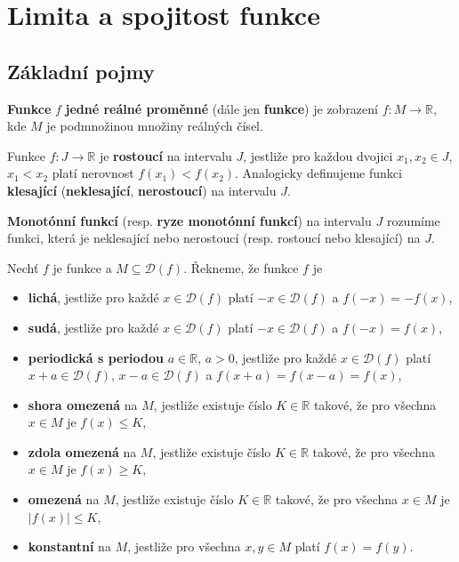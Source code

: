 \section{Limita a spojitost funkce}
\subsection{Základní pojmy}
\begin{definice}
\textbf{Funkce} $f$ \textbf{jedné reálné proměnné} (dále jen \textbf{funkce}) je zobrazení
$f: M\to \mathbb R $, kde $M$ je podmnožinou množiny reálných čísel.
\end{definice}

\begin{definice}
	Funkce $f: J\to \mathbb R $ je \textbf{rostoucí} na intervalu $J$, jestliže pro
	každou dvojici $x_1, x_2 \in J$, $x_1 < x_2$ platí nerovnost $f(x_1)<f(x_2)$. Analogicky
	definujeme funkci \textbf{klesající} (\textbf{neklesající}, \textbf{nerostoucí}) na intervalu $J$.
\end{definice}

\begin{definice}
\textbf{Monotónní funkcí} (resp. \textbf{ryze monotónní funkcí}) na intervalu $J$ rozumíme funkci,
která je neklesající nebo nerostoucí (resp. rostoucí nebo klesající) na $J$.
\end{definice}

\begin{definice}
Nechť $f$ je funkce a $M \subseteq \mathcal D(f)$. Řekneme, že funkce $f$ je
\begin{itemize}
  \item \textbf{lichá}, jestliže pro každé $x \in \mathcal D(f)$ platí $-x \in \mathcal D(f)$ a
  $f(-x) = -f(x)$,
  \item \textbf{sudá}, jestliže pro každé $x \in \mathcal D(f)$ platí $-x \in \mathcal D(f)$ a
  $f(-x) = f(x)$,
  \item \textbf{periodická s periodou} $a \in \mathbb{R}$, $a > 0$, jestliže pro každé
  $x \in \mathcal D(f)$ platí $x + a \in \mathcal D(f)$, $x - a \in \mathcal D(f)$ a
  $f(x + a) = f(x - a) = f(x)$,
  \item \textbf{shora omezená} na $M$, jestliže existuje číslo $K \in \mathbb{R}$ takové,
  že pro všechna $x \in M$ je $f(x) \le K$,
  \item \textbf{zdola omezená} na $M$, jestliže existuje číslo $K \in \mathbb{R}$ takové,
  že pro všechna $x \in M$ je $f(x) \ge K$,
  \item \textbf{omezená} na $M$, jestliže existuje číslo $K \in \mathbb{R}$ takové,
  že pro všechna $x \in M$ je $|f(x)| \le K$,
  \item \textbf{konstantní} na $M$, jestliže pro všechna $x, y \in M$ platí
  $f(x) = f(y)$.
\end{itemize}
\end{definice}

